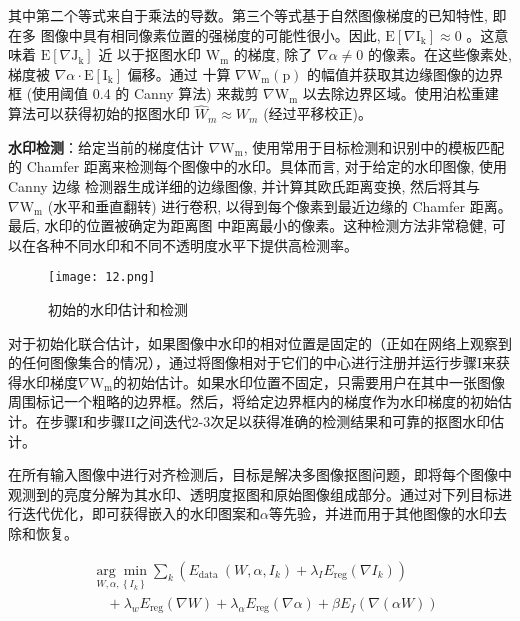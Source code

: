 其中第二个等式来自于乘法的导数。第三个等式基于自然图像梯度的已知特性, 即在多 图像中具有相同像素位置的强梯度的可能性很小。因此, $\mathrm{E}[\nabla \mathrm{I_k}] \approx 0$ 。这意味着 $\mathrm{E}[\nabla \mathrm{J_k}]$ 近 以于抠图水印 $\mathrm{W_m}$ 的梯度, 除了 $\nabla \alpha \neq 0$ 的像素。在这些像素处, 梯度被 $\nabla \alpha \cdot \mathrm{E}[\mathrm{I_k}]$ 偏移。通过 十算 $\nabla \mathrm{W_m}(\mathrm{p})$ 的幅值并获取其边缘图像的边界框 (使用阈值 0.4 的 Canny 算法) 来裁剪 $\nabla \mathrm{W_m}$ 以去除边界区域。使用泊松重建算法可以获得初始的抠图水印 $\widehat{W}_m \approx W_m$ (经过平移校正)。

\noindent\textbf{水印检测}：给定当前的梯度估计 $\nabla \mathrm{W_m}$, 使用常用于目标检测和识别中的模板匹配的 Chamfer 距离来检测每个图像中的水印。具体而言, 对于给定的水印图像, 使用 Canny 边缘 检测器生成详细的边缘图像, 并计算其欧氏距离变换, 然后将其与 $\nabla \mathrm{W_m}$ (水平和垂直翻转) 进行卷积, 以得到每个像素到最近边缘的 Chamfer 距离。最后, 水印的位置被确定为距离图 中距离最小的像素。这种检测方法非常稳健, 可以在各种不同水印和不同不透明度水平下提供高检测率。

\begin{figure}[!htbp]
	\centering
	\texttt{[image: 12.png]}
	\caption{初始的水印估计和检测}
	\label{fig:12}
\end{figure}

对于初始化联合估计，如果图像中水印的相对位置是固定的（正如在网络上观察到的任何图像集合的情况），通过将图像相对于它们的中心进行注册并运行步骤I来获得水印梯度$\nabla \mathrm{W_m}$的初始估计。如果水印位置不固定，只需要用户在其中一张图像周围标记一个粗略的边界框。然后，将给定边界框内的梯度作为水印梯度的初始估计。在步骤I和步骤II之间迭代2-3次足以获得准确的检测结果和可靠的抠图水印估计。

在所有输入图像中进行对齐检测后，目标是解决多图像抠图问题，即将每个图像中观测到的亮度分解为其水印、透明度抠图和原始图像组成部分。通过对下列目标进行迭代优化，即可获得嵌入的水印图案和$\alpha$等先验，并进而用于其他图像的水印去除和恢复。

\begin{equation}
\begin{aligned}
& \underset{W, \alpha,\left\{I_k\right\}}{\arg \min } \sum_k\left(E_{\text {data }}\left(W, \alpha, I_k\right)+\lambda_I E_{\mathrm{reg}}\left(\nabla I_k\right)\right) \\
& \quad+\lambda_w E_{\mathrm{reg}}(\nabla W)+\lambda_\alpha E_{\mathrm{reg}}(\nabla \alpha)+\beta E_f(\nabla(\alpha W))
\end{aligned}
\end{equation}


